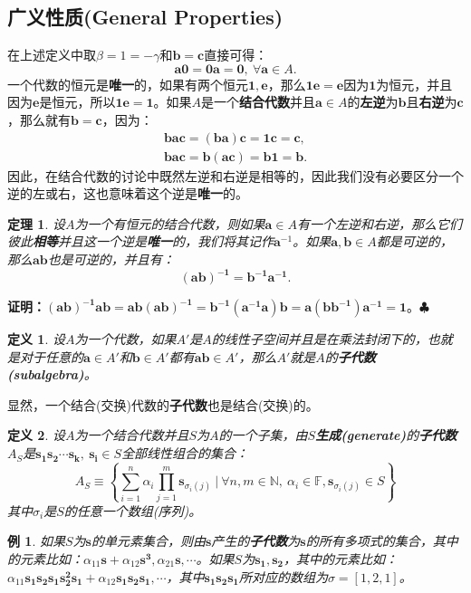 \documentclass[mathserif,hyperref,UTF8,openany,b5paper]{ctexbook}
\newtheorem{exmp}{例}[section]
\newtheorem{defn}{定义}[section]
\newtheorem{thm}{定理}[section]
\begin{document}
\subsection{广义性质(General Properties)}
在上述定义中取$\beta = 1 =−\gamma$和$\mathbf{b=c}$直接可得：
\begin{equation}
    \mathbf{a0=0a=0},\ \forall\mathbf{a}\in A.
\end{equation}
一个代数的恒元是\textbf{唯一}的，如果有两个恒元$\mathbf{1,e}$，那么$\mathbf{1e=e}$因为$\mathbf{1}$为恒元，并且因为$\mathbf{e}$是恒元，所以$\mathbf{1e=1}$。如果$A$是一个\textbf{结合代数}并且$\mathbf{a}\in A$的\textbf{左逆}为$\mathbf{b}$且\textbf{右逆}为$\mathbf{c}$，那么就有$\mathbf{b=c}$，因为：
\begin{align}
\mathbf{bac=(ba)c=1c=c},\\
\mathbf{bac=b(ac)=b1=b}.
\end{align}因此，在结合代数的讨论中既然左逆和右逆是相等的，因此我们没有必要区分一个逆的左或右，这也意味着这个逆是\textbf{唯一}的。
\begin{thm}
设$A$为一个有恒元的结合代数，则如果$\mathbf{a}\in A$有一个左逆和右逆，那么它们彼此\textbf{相等}并且这一个逆是\textbf{唯一}的，我们将其记作$\mathbf{a}^{-1}$。如果$\mathbf{a,b}\in A$都是可逆的，那么$\mathbf{ab}$也是可逆的，并且有：
\begin{equation}
    \mathbf{(ab)^{-1}=b^{-1}a^{-1}}.
\end{equation}
\end{thm}
\textbf{证明：}$\mathbf{(ab)^{-1}ab = ab(ab)^{-1}=b^{-1}(a^{-1}a)b=a(bb^{-1})a^{-1}=1}$。$\clubsuit$
\begin{defn}
设$A$为一个代数，如果$A'$是$A$的线性子空间并且是在乘法封闭下的，也就是对于任意的$\mathbf{a}\in A'$和$\mathbf{b}\in A'$都有$\mathbf{ab}\in A'$，那么$A'$就是$A$的\textbf{子代数(subalgebra)}。
\end{defn}
显然，一个结合(交换)代数的\textbf{子代数}也是结合(交换)的。
\begin{defn}
设$A$为一个结合代数并且$S$为$A$的一个子集，由$S$\textbf{生成(generate)}的\textbf{子代数}$A_S$是$\mathbf{s_1s_2\cdots s_k,\ s_i}\in S$全部线性组合的集合：
\begin{equation}
A_S \equiv \left\{\sum_{i=1}^n\alpha_i\prod_{j=1}^m\mathbf{s}_{\sigma_i(j)}\ \bigg\vert \ \forall n,m\in\mathbb{N},\      \alpha_i\in\mathbb{F},\mathbf{s}_{\sigma_i(j)}\in S\right\}
\end{equation}
其中$\sigma_i$是$S$的任意一个数组(序列)。
\end{defn}
\begin{exmp}
如果$S$为$\mathbf{s}$的单元素集合，则由$\mathbf{s}$产生的\textbf{子代数}为$\mathbf{s}$的所有多项式的集合，其中的元素比如：$\alpha_{11} \mathbf{s}+\alpha_{12} \mathbf{s^3},\alpha_{21}\mathbf{s},\cdots$。如果$S$为$\mathbf{s_1,s_2}$，其中的元素比如：$\alpha_{11}\mathbf{s_1s_2s_1s_2^2s_1}+\alpha_{12}\mathbf{s_1s_2s_1},\cdots$，其中$\mathbf{s_1s_2s_1}$所对应的数组为$\sigma=[1,2,1]$。
\end{exmp}
\end{document}
